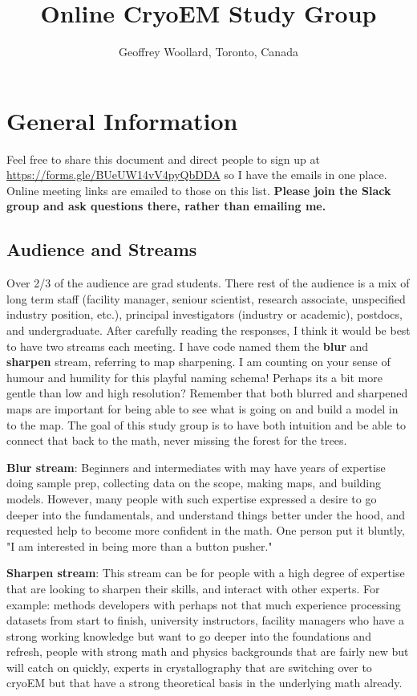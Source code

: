 \documentclass[11pt, oneside]{article}   	%
\title{Online CryoEM Study Group}
\author{Geoffrey Woollard, Toronto, Canada}
\begin{document}
\maketitle

\section{General Information}

Feel free to share this document and direct people to sign up at \url{https://forms.gle/BUeUW14vV4pyQbDDA} so I have the emails in one place. Online meeting links are emailed to those on this list. {\bf Please join the Slack group and ask questions there, rather than emailing me.}

\subsection{Audience and Streams}
Over 2/3 of the audience are grad students. There rest of the audience is a mix of long term staff (facility manager, seniour scientist, research associate, unspecified industry position, etc.), principal investigators (industry or academic), postdocs, and undergraduate. After carefully reading the responses, I think it would be best to have two streams each meeting. I have code named them the {\bf blur} and {\bf sharpen} stream, referring to map sharpening. I am counting on your sense of humour and humility for this playful naming schema! Perhaps its a bit more gentle than low and high resolution? Remember that both blurred and sharpened maps are important for being able to see what is going on and build a model in to the map. The goal of this study group is to have both intuition and be able to connect that back to the math, never missing the forest for the trees.

{\bf  Blur stream}: Beginners and intermediates with may have years of expertise doing sample prep, collecting data on the scope, making maps, and building models. However, many people with such expertise expressed a desire to go deeper into the fundamentals, and understand things better under the hood, and requested help to become more confident in the math. One person put it bluntly, "I am interested in being more than a button pusher."

{\bf Sharpen stream}: This stream can be for people with a high degree of expertise that are looking to sharpen their skills, and interact with other experts. For example: methods developers with perhaps not that much experience processing datasets from start to finish, university instructors, facility managers who have a strong working knowledge but want to go deeper into the foundations and refresh, people with strong math and physics backgrounds that are fairly new but will catch on quickly, experts in crystallography that are switching over to cryoEM but that have a strong theoretical basis in the underlying math already.
\end{document}
